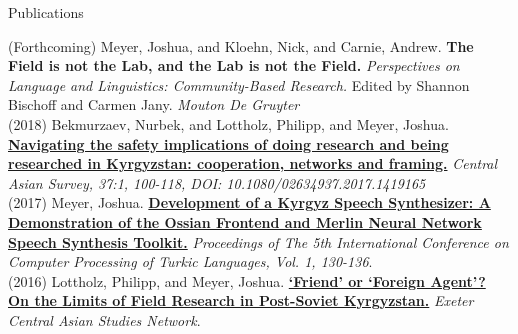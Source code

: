 \documentclass{resume} %
\begin{document}
\begin{minipage}{\textwidth}

  \begin{rSection}{Publications}
    \vspace{.25cm}

        {(Forthcoming)} {Meyer, Joshua, and Kloehn, Nick, and Carnie, Andrew.} {{\bf The Field is not the Lab, and the Lab is not the Field.}} {{\it Perspectives on Language and Linguistics: Community-Based Research.} Edited by Shannon Bischoff and Carmen Jany. \textit{Mouton De Gruyter}}\\

        {(2018)} {Bekmurzaev, Nurbek, and Lottholz, Philipp, and Meyer, Joshua.} {\href{https://www.tandfonline.com/doi/abs/10.1080/02634937.2017.1419165}{\textbf{Navigating the safety implications of doing research and being researched in Kyrgyzstan: cooperation, networks and framing.}}} {\textit{Central Asian Survey, 37:1, 100-118, DOI: 10.1080/02634937.2017.1419165}}\\
        
        {(2017)} {Meyer, Joshua.} {\href{http://www.turklang.tatar/wp-content/uploads/2017/05/TurkLang-2017.-Tom1.pdf}{{\bf Development of a Kyrgyz Speech Synthesizer: A Demonstration of the Ossian Frontend and Merlin Neural Network Speech Synthesis Toolkit.}}} {\textit{Proceedings of The 5th International Conference on Computer Processing of Turkic Languages, Vol. 1, 130-136}.}\\ 

        {(2016)} {Lottholz, Philipp, and Meyer, Joshua.} { \href{https://blogs.exeter.ac.uk/excas/2016/04/14/friend-or-foreign-agent-on-the-limits-of-field-research-in-post-soviet-kyrgyzstan/}{\bf ‘Friend’ or ‘Foreign Agent’? On the Limits of Field Research in Post-Soviet Kyrgyzstan.}} {\textit{Exeter Central Asian Studies Network}.}\\
 

\end{rSection}

\end{minipage}
\end{document}
